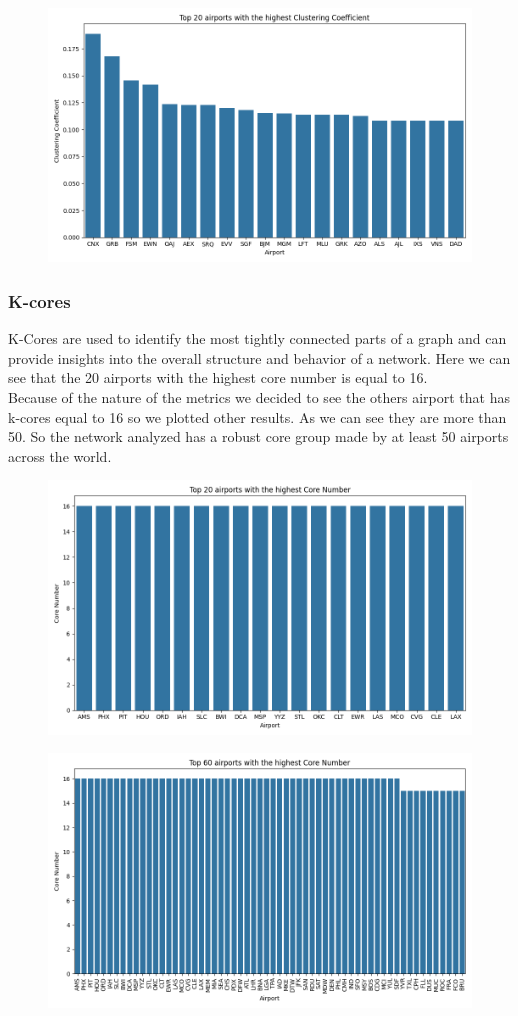 \documentclass[12pt]{article}
\begin{document}
    \begin{figure}[H]
        \centering
        \includegraphics[width=0.8\linewidth]{img/clustering_coefficient}
    \end{figure}

    \subsubsection{K-cores}
    K-Cores are used to identify the most tightly connected parts of a graph and can provide insights into the overall structure and behavior of a network. Here we can see that the 20 airports with the highest core number is equal to 16.\\
    Because of the nature of the metrics we decided to see the others airport that has k-cores equal to 16 so we plotted other results. As we can see they are more than 50. So the network analyzed has a robust core group made by at least 50 airports across the world.

    \begin{figure}[H]
        \centering
        \includegraphics[width=0.8\linewidth]{img/core_number}
    \end{figure}
    \begin{figure}[H]
        \centering
        \includegraphics[width=0.8\linewidth]{img/more_core_number}
    \end{figure}
\end{document}
